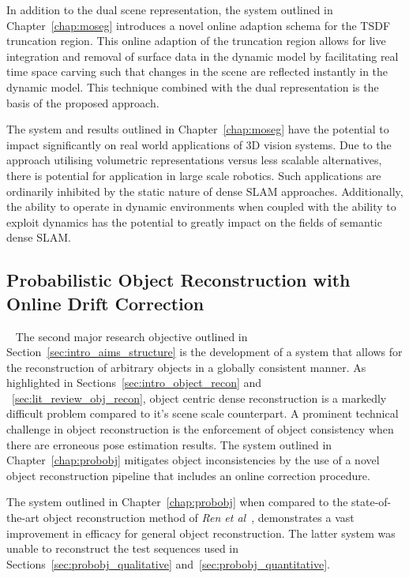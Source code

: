 In addition to the dual scene representation, the system outlined in Chapter~\ref{chap:moseg} 
introduces a novel online adaption schema for the TSDF truncation region. This online adaption 
of the truncation region allows for live integration and removal of surface data in the dynamic 
model by facilitating real time space carving such that changes in the scene are reflected 
instantly in the dynamic model. This technique combined with the dual representation is the 
basis of the proposed approach.

The system and results outlined in Chapter~\ref{chap:moseg} have the potential to impact 
significantly on real world applications of 3D vision systems. Due to the approach utilising 
volumetric representations versus less scalable alternatives, there is potential for application 
in large scale robotics. Such applications are ordinarily inhibited by the static nature of 
dense SLAM approaches. Additionally, the ability to operate in dynamic environments when coupled 
with the ability to exploit dynamics has the potential to greatly impact on the fields of semantic 
dense SLAM\@.

\subsection{Probabilistic Object Reconstruction with Online Drift Correction}
~\label{subsec:discussion_probobj}
The second major research objective outlined in Section~\ref{sec:intro_aims_structure} is the 
development of a system that allows for the reconstruction of arbitrary objects in a globally 
consistent manner. As highlighted in Sections~\ref{sec:intro_object_recon} and
~\ref{sec:lit_review_obj_recon}, object centric dense reconstruction is a markedly difficult 
problem compared to it's scene scale counterpart. A prominent technical challenge in object 
reconstruction is the enforcement of object consistency when there are erroneous pose estimation 
results. The system outlined in Chapter~\ref{chap:probobj} mitigates object inconsistencies by 
the use of a novel object reconstruction pipeline that includes an online correction procedure.

The system outlined in Chapter~\ref{chap:probobj} when compared to the state-of-the-art object 
reconstruction method of \textit{Ren et al}~\cite{Ren2013}, demonstrates a vast improvement in 
efficacy for general object reconstruction. The latter system was unable to reconstruct the test 
sequences used in Sections~\ref{sec:probobj_qualitative} and~\ref{sec:probobj_quantitative}. 

